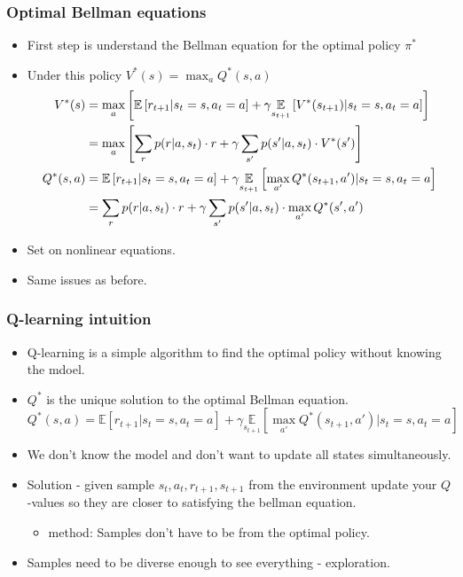 \documentclass[handout]{beamer}
\begin{document}
\begin{frame}\frametitle{Optimal Bellman equations}\small
\begin{itemize}
	\item First step is understand the Bellman equation for the optimal policy $\pi^*$
	\onslide<2->\item Under this policy $V^*(s)=\max_a Q^*(s,a)$
		{\footnotesize
		\begin{align*}\footnotesize
		V^*(s)& = \max_a\left[\mathbb{E}\left[r_{t+1} |s_t=s,a_t=a\right] +\gamma \underset{s_{t+1}}{\mathbb{E}}\left[V^{*}(s_{t+1})|s_t=s,a_t=a\right]\right] \\
		&= \max_a\left[\sum_{r}p(r|a,s_t)\cdot r+\gamma \sum_{s'}p(s'|a,s_t)\cdot V^*(s')\right] \\
		Q^*(s,a)&=\mathbb{E}\left[r_{t+1} |s_t=s,a_t=a\right]+ \gamma\underset{s_{t+1}}{\mathbb{E}}\left[\max_{a'}Q^{*}(s_{t+1},a')|s_t=s,a_t=a\right] \\
		&= \sum_{r}p(r|a,s_t)\cdot r+\gamma \sum_{s'}p(s'|a,s_t)\cdot\max_{a'} Q^*(s',a')
		\end{align*}}
	\onslide<3-> \item Set on nonlinear equations.
	\onslide<4-> \item Same issues as before.
	
\end{itemize}
\end{frame}


\begin{frame}\frametitle{Q-learning intuition}\small
\begin{itemize}
	\item Q-learning is a simple algorithm to find the optimal policy without knowing the mdoel.
		\onslide<2->\item $Q^*$ is the unique solution to the optimal Bellman equation.
	\[
	Q^*(s,a)=\mathbb{E}\left[r_{t+1} |s_t=s,a_t=a\right]+ \gamma\underset{s_{t+1}}{\mathbb{E}}\left[\max_{a'}Q^{*}(s_{t+1},a')|s_t=s,a_t=a\right]
	\]
	\onslide<3->\item We don't know the model and don't want to update all states simultaneously.
	\onslide<4->\item Solution - given sample $s_t,a_t,r_{t+1},s_{t+1}$ from the environment update your $Q$-values so they are closer to satisfying the bellman equation.
	\begin{itemize}
		\item {} method: Samples don't have to be from the optimal policy.

	\end{itemize} 
	\item Samples need to be diverse enough to see everything - exploration.
\end{itemize}
\end{frame}
\end{document}
